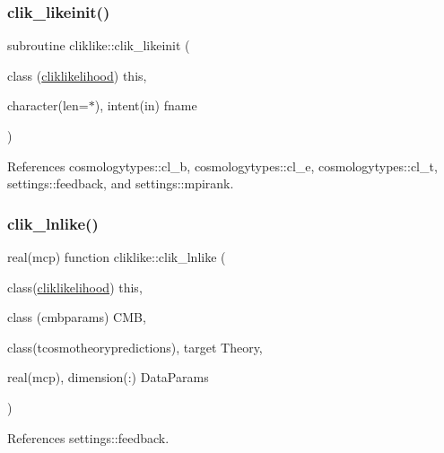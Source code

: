 \mbox{\label{namespacecliklike_a093a22f8a8a490ec917ebc7a92c27c2b}} 
\subsubsection{\texorpdfstring{clik\+\_\+likeinit()}{clik\_likeinit()}}
{\footnotesize\ttfamily subroutine cliklike\+::clik\+\_\+likeinit (\begin{DoxyParamCaption}\item[{class (\mbox{\hyperlink{structcliklike_1_1cliklikelihood}{cliklikelihood}})}]{this,  }\item[{character(len=$\ast$), intent(in)}]{fname }\end{DoxyParamCaption})\hspace{0.3cm}{\ttfamily [private]}}



References cosmologytypes\+::cl\+\_\+b, cosmologytypes\+::cl\+\_\+e, cosmologytypes\+::cl\+\_\+t, settings\+::feedback, and settings\+::mpirank.

\mbox{\label{namespacecliklike_a8fa2426732ea59e352d0c0e13011fe62}} 
\subsubsection{\texorpdfstring{clik\+\_\+lnlike()}{clik\_lnlike()}}
{\footnotesize\ttfamily real(mcp) function cliklike\+::clik\+\_\+lnlike (\begin{DoxyParamCaption}\item[{class(\mbox{\hyperlink{structcliklike_1_1cliklikelihood}{cliklikelihood}})}]{this,  }\item[{class (cmbparams)}]{C\+MB,  }\item[{class(tcosmotheorypredictions), target}]{Theory,  }\item[{real(mcp), dimension(\+:)}]{Data\+Params }\end{DoxyParamCaption})\hspace{0.3cm}{\ttfamily [private]}}



References settings\+::feedback.

\mbox{\label{namespacecliklike_afd6ed043a70bb783b9840d5569cb85bb}} 
